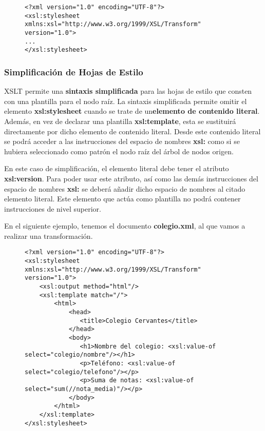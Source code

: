 \begin{figure}[H]
    \begin{tcolorbox}[sharp corners, colback=yellow!30, colframe=white!20]
        \scriptsize
\begin{verbatim}
<?xml version="1.0" encoding="UTF-8"?>
<xsl:stylesheet xmlns:xsl="http://www.w3.org/1999/XSL/Transform" version="1.0">
...
</xsl:stylesheet>
\end{verbatim}
    \end{tcolorbox}
\end{figure}

\subsubsection{Simplificación de Hojas de Estilo}
XSLT permite una \textbf{sintaxis simplificada} para las hojas de estilo que consten con una plantilla para el nodo raíz. La sintaxis simplificada permite omitir el elemento \textbf{xsl:stylesheet} cuando se trate de un\textbf{elemento de contenido literal}. Además, en vez de declarar una plantilla \textbf{xsl:template}, esta se sustituirá directamente por dicho elemento de contenido literal. Desde este contenido literal se podrá acceder a las instrucciones del espacio de nombres \textbf{xsl:} como si se hubiera seleccionado como patrón el nodo raíz del árbol de nodos origen.

En este caso de simplificación, el elemento literal debe tener el atributo \textbf{xsl:version}. Para poder usar este atributo, así como las demás instrucciones del espacio de nombres \textbf{xsl:} se deberá añadir dicho espacio de nombres al citado elemento literal. Este elemento que actúa como plantilla no podrá contener instrucciones de nivel superior.

En el siguiente ejemplo, tenemos el documento \textbf{colegio.xml}, al que vamos a realizar una transformación.

\begin{figure}[H]
    \begin{tcolorbox}[sharp corners, colback=yellow!30, colframe=white!20]
        \scriptsize
\begin{verbatim}
<?xml version="1.0" encoding="UTF-8"?>
<xsl:stylesheet xmlns:xsl="http://www.w3.org/1999/XSL/Transform" version="1.0">
    <xsl:output method="html"/>
    <xsl:template match="/">
        <html>
            <head>
               <title>Colegio Cervantes</title>
            </head>
            <body>
               <h1>Nombre del colegio: <xsl:value-of select="colegio/nombre"/></h1>
               <p>Teléfono: <xsl:value-of select="colegio/telefono"/></p>
               <p>Suma de notas: <xsl:value-of select="sum(//nota_media)"/></p>
            </body>
        </html>
    </xsl:template>
</xsl:stylesheet>
\end{verbatim}
    \end{tcolorbox}
\end{figure}


